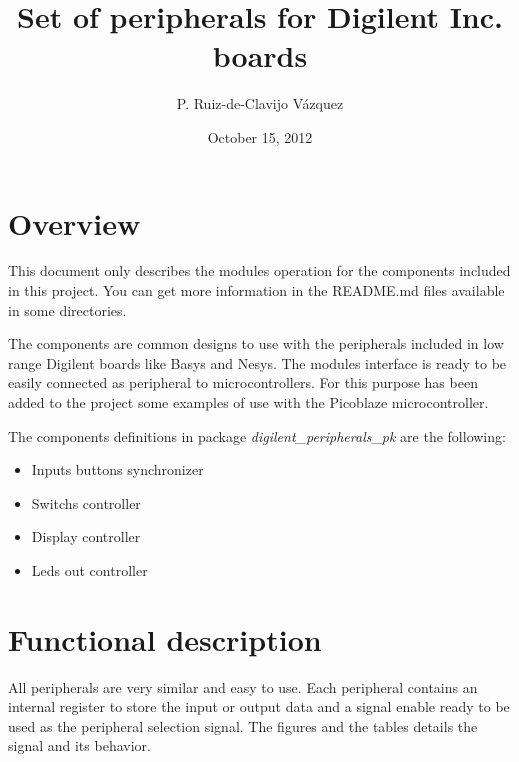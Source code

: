 \documentclass[10pt,a4paper,onecolumn]{article}
\begin{document}
\title{Set of peripherals for Digilent Inc. boards}

\author{P. Ruiz-de-Clavijo V\'azquez}
\date{October 15, 2012}

\maketitle


\section*{Overview}

This document only describes the modules operation for the components included 
in this project. You can get more information in the README.md files 
available in some directories.

The components are common designs to use with the peripherals included in low 
range Digilent boards like Basys and Nesys. 
The modules interface is ready to be easily connected as  peripheral to 
microcontrollers. For this purpose has been added to the project some examples 
of use with the Picoblaze microcontroller.

The components definitions in package \emph{digilent\_peripherals\_pk} are the following:

\begin{itemize}
\item Inputs buttons synchronizer
\item Switchs controller
\item Display controller
\item Leds out controller
\end{itemize}

\section*{Functional description}

All peripherals are very similar and easy to use. Each peripheral contains an internal register to store the input or output data and a signal enable ready to be used as the peripheral selection signal. The figures and the tables details the signal and its behavior.
\end{document}
